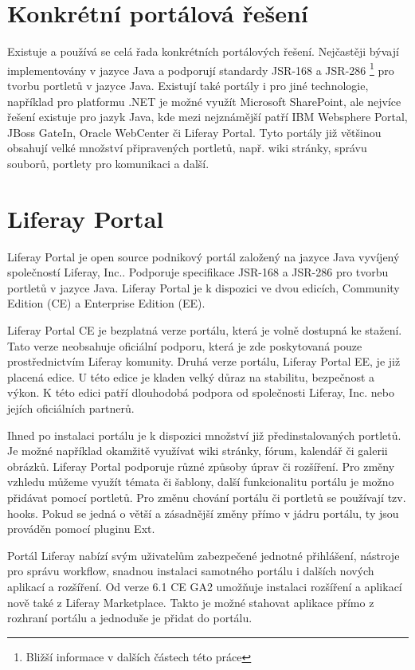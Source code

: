 \documentclass{fithesis}
\begin{document}
\section{Konkrétní portálová řešení}
Existuje a používá se celá řada konkrétních portálových řešení. Nejčastěji bývají implementovány v jazyce Java a podporují standardy JSR-168 a JSR-286 \footnote[2]{Bližší informace v dalších částech této práce} pro tvorbu portletů v jazyce Java. Existují také portály i pro jiné technologie, například pro platformu .NET je možné využít Microsoft SharePoint, ale nejvíce řešení existuje pro jazyk Java, kde mezi nejznámější patří IBM Websphere Portal, JBoss GateIn, Oracle WebCenter či Liferay Portal. Tyto portály již většinou obsahují velké množství připravených portletů, např. wiki stránky, správu souborů, portlety pro komunikaci a další.

\section{Liferay Portal}
Liferay Portal je open source podnikový portál založený na jazyce Java vyvíjený společností Liferay, Inc.. Podporuje specifikace JSR-168 a JSR-286 pro tvorbu portletů v jazyce Java. Liferay Portal je k dispozici ve dvou edicích, Community Edition (CE) a Enterprise Edition (EE).

Liferay Portal CE je bezplatná verze portálu, která je volně dostupná ke stažení. Tato verze neobsahuje oficiální podporu, která je zde poskytovaná pouze prostřednictvím Liferay komunity. Druhá verze portálu, Liferay Portal EE, je již placená edice. U této edice je kladen velký důraz na stabilitu, bezpečnost a výkon. K této edici patří dlouhodobá podpora od společnosti Liferay, Inc. nebo jejích oficiálních partnerů.

Ihned po instalaci portálu je k dispozici množství již předinstalovaných portletů. Je možné například okamžitě využívat wiki stránky, fórum, kalendář či galerii obrázků. Liferay Portal podporuje různé způsoby úprav či rozšíření. Pro změny vzhledu můžeme využít témata či šablony, další funkcionalitu portálu je možno přidávat pomocí portletů. Pro změnu chování portálu či portletů se používají tzv. hooks. Pokud se jedná o větší a zásadnější změny přímo v jádru portálu, ty jsou prováděn pomocí pluginu Ext. \cite{developer-guide}

Portál Liferay nabízí svým uživatelům zabezpečené jednotné přihlášení, nástroje pro správu workflow, snadnou instalaci samotného portálu i dalších nových aplikací a rozšíření. Od verze 6.1 CE GA2 umožňuje instalaci rozšíření a aplikací nově také z Liferay Marketplace. Takto je možné stahovat aplikace přímo z rozhraní portálu a jednoduše je přidat do portálu.
\end{document}
